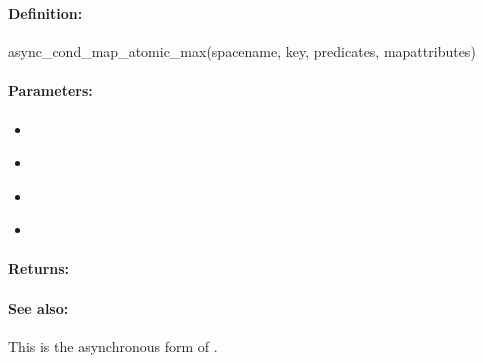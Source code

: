 \pagebreak
\subsubsection{}
\label{api:ruby:async_cond_map_atomic_max}


\paragraph{Definition:}
\begin{rubycode}
async_cond_map_atomic_max(spacename, key, predicates, mapattributes)
\end{rubycode}

\paragraph{Parameters:}
\begin{itemize}[noitemsep]
\item {}\\

\item {}\\

\item {}\\

\item {}\\

\end{itemize}

\paragraph{Returns:}


\paragraph{See also:}  This is the asynchronous form of .

\pagebreak
\subsubsection{}
\label{api:ruby:search}


